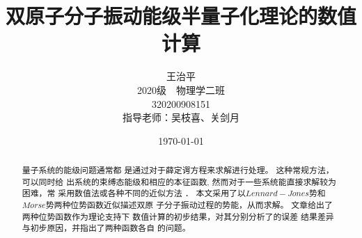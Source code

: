 \documentclass[11pt, a4paper, oneside]{ctexart}
\title{\textbf{双原子分子振动能级半量子化理论的数值计算}}
\author{{王治平} 
\\\vspace{-6mm}
\small{2020级\ \ 物理学二班}
\\\small{320200908151}
\\{指导老师：吴枝喜、关剑月}}
\date{\today}
\begin{document}
\maketitle
	

    \maketitle

    \setcounter{page}{0}
    \maketitle
    \thispagestyle{empty}
    ~\\~\\~\\

\maketitle

\setcounter{page}{0}
\maketitle
\thispagestyle{empty}

\begin{abstract}
    {
        量子系统的能级问题通常都
        是通过对于薛定谔方程来求解进行处理。
        这种常规方法，可以同时给
        出系统的束缚态能级和相应的本征函数,
        然而对于一些系统能直接求解较为困难，常
        采用数值法或各种不同的近似方法 ．
        本文采用了以$Lennard-Jones$势和
        $Morse$势两种位势函数近似描述双原
        子分子振动过程的势能，从而求解。
        文章给出了两种位势函数作为理论支持下
        数值计算的初步结果，对其分别分析了的误差
        结果差异与初步原因，并指出了两种函数各自
        的问题。


    }
\end{abstract}
\end{document}
